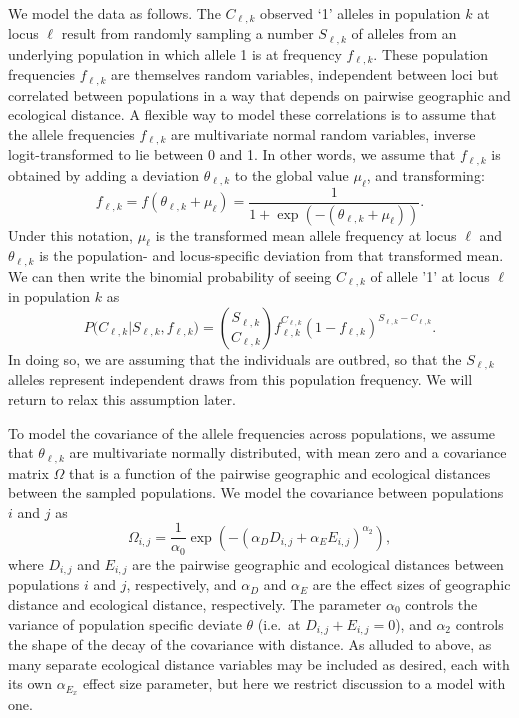 We model the data as follows.
The $C_{\ell,k}$ observed `1' alleles in population $k$ at locus $\ell$ result from randomly sampling a number $S_{\ell,k}$ of alleles from an underlying population in which allele 1 is at frequency $f_{\ell,k}$.  These population frequencies $f_{\ell, k}$ are themselves random variables, independent between loci 
but correlated between populations in a way that depends on pairwise geographic and ecological distance.  
A flexible way to model these correlations is to assume that the allele frequencies $f_{\ell,k}$ are multivariate normal random variables, inverse logit-transformed to lie between 0 and 1.  
In other words, we assume that $f_{\ell,k}$ 
is obtained by adding a deviation $\theta_{\ell,k}$ to the global value $\mu_\ell$,
and transforming:
\begin{equation} \label{eqn:logit_defn}
f_{\ell,k} =f(\theta_{\ell,k}+\mu_{\ell}) = \frac{1}{1+\exp(-(\theta_{\ell,k}+\mu_{\ell}))} .
\end{equation}
Under this notation, $\mu_{\ell}$ is the transformed mean allele frequency at locus $\ell$ and $\theta_{\ell,k}$ is the population- and locus-specific deviation from that transformed mean.
We can then write the binomial probability of seeing $C_{\ell,k}$ of allele '1' at locus $\ell$ in population $k$ as
\begin{equation}
  P\big(C_{\ell,k}|S_{\ell,k},f_{\ell,k} \big) = \binom{S_{\ell,k}}{C_{\ell,k}} f_{\ell,k}^{C_{\ell,k}}(1-f_{\ell,k})^{S_{\ell,k}-C_{\ell,k}}.
\end{equation}
In doing so, we are assuming that the individuals are outbred, so that the $S_{\ell,k}$ alleles represent independent draws from this population frequency.  We will return to relax this assumption later.

To model the covariance of the allele frequencies across populations, we assume that $\theta_{\ell,k}$ are multivariate normally distributed, with mean zero and a covariance matrix $\Omega$ that is a function of the pairwise geographic and ecological distances between the sampled populations.  We model the covariance between populations $i$ and $j$ as
\begin{equation} \label{eqn:covariance_form}
\Omega_{i,j} = \frac{1}{\alpha_{0}}\exp{\left(-(\alpha_{D}D_{i,j}+\alpha_{E}E_{i,j})^{\alpha_{2}}\right)} ,
\end{equation}
where $D_{i,j}$ and $E_{i,j}$ are the pairwise geographic and ecological distances between populations $i$ and $j$, respectively, and $\alpha_{D}$ and $\alpha_{E}$ are the effect sizes of geographic distance and ecological distance, respectively. The parameter $\alpha_{0}$ controls the variance of population specific deviate $\theta$ (i.e.\ at $D_{i,j} + E_{i,j} = 0$), and $\alpha_{2}$ controls the shape of the decay of the covariance with distance.   As alluded to above, as many separate ecological distance variables may be included as desired, each with its own $\alpha_{E_{x}}$ effect size parameter, but here we restrict discussion to a model with one.

